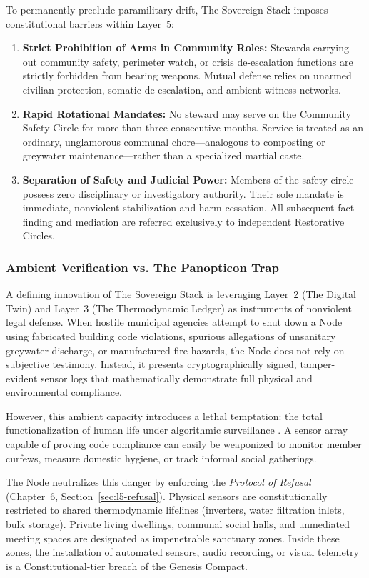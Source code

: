 To permanently preclude paramilitary drift, The Sovereign Stack imposes constitutional barriers within Layer~5:
\begin{enumerate}
    \item \textbf{Strict Prohibition of Arms in Community Roles:} Stewards carrying out community safety, perimeter watch, or crisis de-escalation functions are strictly forbidden from bearing weapons. Mutual defense relies on unarmed civilian protection, somatic de-escalation, and ambient witness networks.
    \item \textbf{Rapid Rotational Mandates:} No steward may serve on the Community Safety Circle for more than three consecutive months. Service is treated as an ordinary, unglamorous communal chore---analogous to composting or greywater maintenance---rather than a specialized martial caste.
    \item \textbf{Separation of Safety and Judicial Power:} Members of the safety circle possess zero disciplinary or investigatory authority. Their sole mandate is immediate, nonviolent stabilization and harm cessation. All subsequent fact-finding and mediation are referred exclusively to independent Restorative Circles.
\end{enumerate}

\subsubsection{Ambient Verification vs. The Panopticon Trap}

A defining innovation of The Sovereign Stack is leveraging Layer~2 (The Digital Twin) and Layer~3 (The Thermodynamic Ledger) as instruments of nonviolent legal defense. When hostile municipal agencies attempt to shut down a Node using fabricated building code violations, spurious allegations of unsanitary greywater discharge, or manufactured fire hazards, the Node does not rely on subjective testimony. Instead, it presents cryptographically signed, tamper-evident sensor logs that mathematically demonstrate full physical and environmental compliance.

However, this ambient capacity introduces a lethal temptation: the total functionalization of human life under algorithmic surveillance \parencite{zuboff2019, han2015}. A sensor array capable of proving code compliance can easily be weaponized to monitor member curfews, measure domestic hygiene, or track informal social gatherings.

The Node neutralizes this danger by enforcing the \textit{Protocol of Refusal} (Chapter~6, Section~\ref{sec:l5-refusal}). Physical sensors are constitutionally restricted to shared thermodynamic lifelines (inverters, water filtration inlets, bulk storage). Private living dwellings, communal social halls, and unmediated meeting spaces are designated as impenetrable sanctuary zones. Inside these zones, the installation of automated sensors, audio recording, or visual telemetry is a Constitutional-tier breach of the Genesis Compact.

